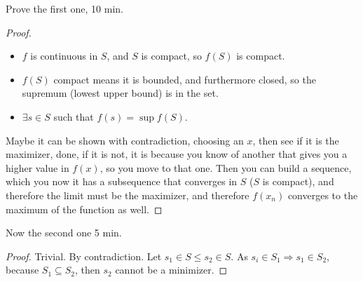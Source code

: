 \documentclass[aspectratio=169]{beamer}
\begin{document}
\begin{frame}
    
    Prove the first one, 10 min.
    
    \begin{proof}
    \begin{itemize}
        \item $f$ is continuous in $S$, and $S$ is compact, so $f(S)$ is compact.\pause
        \item $f(S)$ compact means it is bounded, and furthermore closed, so the supremum (lowest upper bound) is in the set.\pause
        \item $\exists s\in S$ such that $f(s)=\sup f(S)$.\pause
    \end{itemize}
    
    Maybe it can be shown with contradiction, choosing an $x$, then see if it is the maximizer, done, if it is not, it is because you know of another that gives you a higher value in $f(x)$, so you move to that one. Then you can build a sequence, which you now it has a subsequence that converges in $S$ ($S$ is compact), and therefore the limit must be the maximizer, and therefore $f(x_n)$ converges to the maximum of the function as well.
    
    \end{proof}
    
\end{frame}

\begin{frame}
    Now the second one 5 min.\pause
    
    \begin{proof}
        
        Trivial. By contradiction. Let $s_1 \in S \leq s_2 \in S$. As $s_i\in S_1 \Rightarrow s_1\in S_2$, because $S_1\subseteq S_2$, then $s_2$ cannot be a minimizer.
        
    \end{proof}
    
\end{frame}
\end{document}
